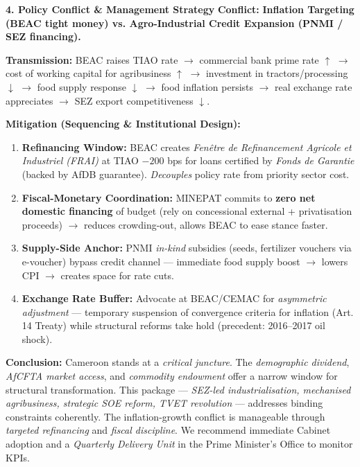 \documentclass[11pt]{article}
\begin{document}
\begin{exemplebox}
\textbf{4. Policy Conflict \& Management Strategy}
\textbf{Conflict:} \textbf{Inflation Targeting (BEAC tight money) vs. Agro-Industrial Credit Expansion (PNMI / SEZ financing).}
\par
\textbf{Transmission:} BEAC raises TIAO rate $\to$ commercial bank prime rate $\uparrow$ $\to$ cost of working capital for agribusiness $\uparrow$ $\to$ investment in tractors/processing $\downarrow$ $\to$ food supply response $\downarrow$ $\to$ food inflation persists $\to$ real exchange rate appreciates $\to$ SEZ export competitiveness $\downarrow$.
\par
\textbf{Mitigation (Sequencing \& Institutional Design):}
\begin{enumerate}
    \item \textbf{Refinancing Window:} BEAC creates \emph{Fenêtre de Refinancement Agricole et Industriel (FRAI)} at TIAO $-200$ bps for loans certified by \emph{Fonds de Garantie} (backed by AfDB guarantee). \emph{Decouples} policy rate from priority sector cost.
    \item \textbf{Fiscal-Monetary Coordination:} MINEPAT commits to \textbf{zero net domestic financing} of budget (rely on concessional external + privatisation proceeds) $\to$ reduces crowding-out, allows BEAC to ease stance faster.
    \item \textbf{Supply-Side Anchor:} PNMI \emph{in-kind} subsidies (seeds, fertilizer vouchers via e-voucher) bypass credit channel — immediate food supply boost $\to$ lowers CPI $\to$ creates space for rate cuts.
    \item \textbf{Exchange Rate Buffer:} Advocate at BEAC/CEMAC for \emph{asymmetric adjustment} — temporary suspension of convergence criteria for inflation (Art. 14 Treaty) while structural reforms take hold (precedent: 2016--2017 oil shock).
\end{enumerate}

\medskip\noindent
\textbf{Conclusion:} Cameroon stands at a \emph{critical juncture}. The \emph{demographic dividend}, \emph{AfCFTA market access}, and \emph{commodity endowment} offer a narrow window for structural transformation. This package — \emph{SEZ-led industrialisation, mechanised agribusiness, strategic SOE reform, TVET revolution} — addresses binding constraints coherently. The inflation-growth conflict is manageable through \emph{targeted refinancing} and \emph{fiscal discipline}. We recommend immediate Cabinet adoption and a \emph{Quarterly Delivery Unit} in the Prime Minister's Office to monitor KPIs.


\end{exemplebox}
\end{document}
